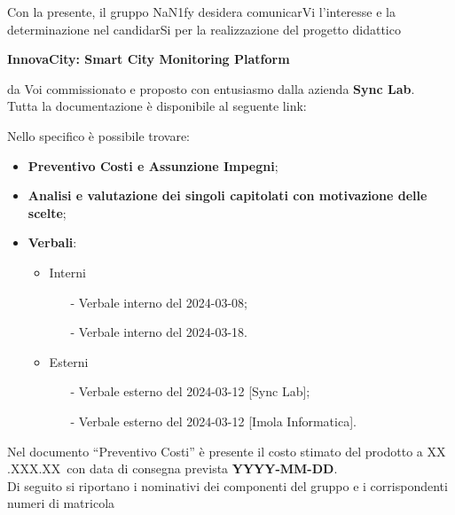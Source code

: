 Con la presente, il gruppo NaN1fy desidera comunicarVi l'interesse e la determinazione nel candidarSi per la realizzazione del progetto didattico \\
\begin{center}
	\textbf{InnovaCity: Smart City Monitoring Platform}
\end{center}
da Voi commissionato e proposto con entusiasmo dalla azienda \textbf{Sync Lab}.
\vspace{1em}
\\Tutta la documentazione è disponibile al seguente link: 
\begin{center}
	\textbf{\href{https://github.com/NaN1fy/docs/tree/main/documents/candidatura}{\color{myblue}{https://github.com/NaN1fy/docs/tree/main/documents/candidatura}}}
\end{center}
Nello specifico è possibile trovare:
\begin{itemize}
	\item \textbf{Preventivo Costi e Assunzione Impegni};
	\item \textbf{Analisi e valutazione dei singoli capitolati con motivazione delle scelte};
	\item \textbf{Verbali}: 
		\begin{itemize}
			\item Interni 
				\begin{itemize}
					\item[-] Verbale interno del 2024-03-08;
					\item[-] Verbale interno del 2024-03-18.
				\end{itemize}
			\item Esterni
				\begin{itemize}
					\item[-] Verbale esterno del 2024-03-12 [Sync Lab];
					\item[-] Verbale esterno del 2024-03-12 [Imola Informatica].
				\end{itemize}
		\end{itemize}
\end{itemize}
\vspace{1em}
Nel documento “Preventivo Costi” è presente il costo stimato del prodotto a XX .XXX.XX\texteuro\ con data di consegna prevista \textbf{YYYY-MM-DD}.\\
\vspace{1em}
Di seguito si riportano i nominativi dei componenti del gruppo e i corrispondenti numeri di matricola\\
